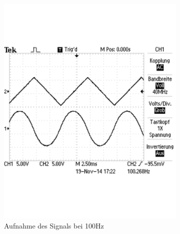 \documentclass[12pt,a4paper]{article}
\begin{document}
\begin{figure}[H]
        \centering
        \begin{subfigure}[b]{0.28\textwidth}
                \includegraphics[width=\textwidth , scale = 0.4]{2_6_drei_100.pdf}
                \caption[Aufnahme des Signals bei 100Hz]{Aufnahme des Signals bei 100Hz}
                \label{fig:2_6_drei_100}
        \end{subfigure}%
        \hfill
        \begin{subfigure}[b]{0.28\textwidth}

\end{subfigure}
\end{figure}
\end{document}
